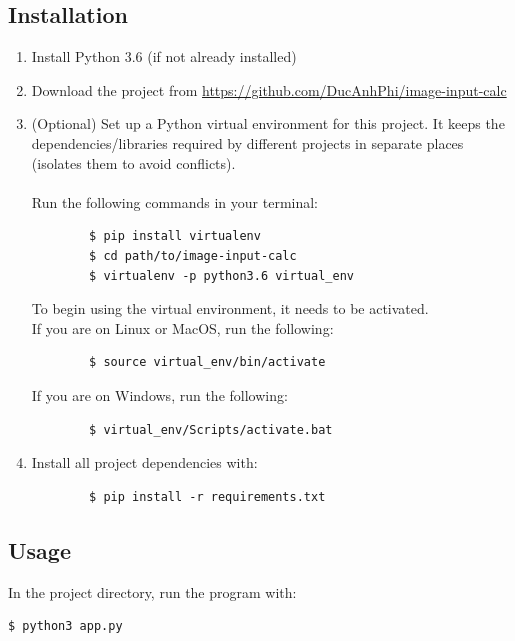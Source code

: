 \documentclass[11pt]{article}
\begin{document}
	\subsection{Installation}
	\begin{enumerate}
		\item Install Python 3.6 (if not already installed)
		\item Download the project from \url{https://github.com/DucAnhPhi/image-input-calc}
		\item (Optional) Set up a Python virtual environment for this project. It keeps the dependencies/libraries required by different projects in separate places (isolates them to avoid conflicts). \\
		\\
		Run the following commands in your terminal:
		\begin{verbatim}
		$ pip install virtualenv
		$ cd path/to/image-input-calc
		$ virtualenv -p python3.6 virtual_env
		\end{verbatim}
		To begin using the virtual environment, it needs to be activated.
		\\
		If you are on Linux or MacOS, run the following:

		\begin{verbatim}
		$ source virtual_env/bin/activate
		\end{verbatim}

		If you are on Windows, run the following:

		\begin{verbatim}
		$ virtual_env/Scripts/activate.bat
		\end{verbatim}

		\item Install all project dependencies with:
		\begin{verbatim}
		$ pip install -r requirements.txt
		\end{verbatim}
	\end{enumerate}




\subsection{Usage}
In the project directory, run the program with:

\begin{verbatim}
$ python3 app.py
\end{verbatim}

\newpage
\printbibliography[heading=bibintoc, title={Sources}]
\end{document}

